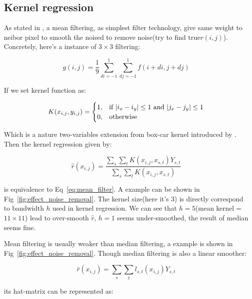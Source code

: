 \documentclass{article}
\begin{document}
\subsection{Kernel regression}

As stated in \cite{solomon2011fundamentals}, a mean filtering, as simplest filter technology, give same weight to neibor pixel to smooth the
noised to remove noise(try to find true$r(i,j)$). Concretely, here's a instance of $3 \times 3$ filtering:

\begin{equation}
g(i,j) = \frac{1}{9} \sum_{di=-1}^1 \sum_{dj=-1}^1 f(i+di,j+dj)
\label{eq:mean_filter}
\end{equation}

If we set kernel function as:

$$ 
K(x_{i,j},y_{i,j}) =  
\begin{cases}
  1, & \text{if $ |i_x - i_y| \le 1$ and $|j_x - j_y| \le 1$} \\
  0, & \text{otherwise}
\end{cases}
$$

Which is a nature two-variables extension from box-car kernel introduced by \cite{wasserman2006all}.
Then the kernel regression given by:

$$
\hat{r}(x_{i,j}) = \frac{\sum_{s} \sum_{t} K(x_{i,j},x_{s,t}) Y_{s,t}}{\sum_{s} \sum_{t} K(x_{i,j},x_{s,t})}
$$

is equivalence to Eq~\ref{eq:mean_filter}. A example can be shown in Fig~\ref{fig:effect_noise_removal}. 
The kernel size(here it's $3$) is directly correspond to bandwidth $h$ used in kernel regression. 
We can see that $h=5$(mean kernel = $11 \times 11 $) lead to over-smooth $\hat{r}$, $h=1$ seems under-smoothed,
the result of median seems fine.

Mean filtering is usually weaker than median filtering, a example is shown in Fig~\ref{fig:effect_noise_removal}. 
Though median filtering is also a linear smoother: 

$$
\hat{r}(x_{i,j})=\sum_s \sum_t l_{s,t}(x_{i,j})Y_{s,t}$$

its hat-matrix can be represented as: 
\end{document}
